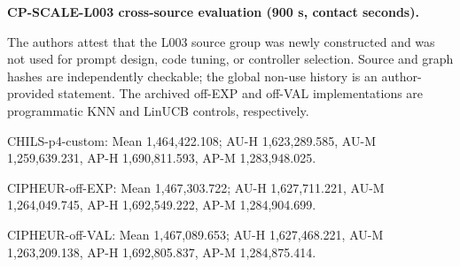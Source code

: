 \begingroup\raggedright
\noindent\textbf{CP-SCALE-L003 cross-source evaluation (900 s, contact seconds).}\par
\noindent The authors attest that the L003 source group was newly constructed and was not used for prompt design, code tuning, or controller selection. Source and graph hashes are independently checkable; the global non-use history is an author-provided statement. The archived off-EXP and off-VAL implementations are programmatic KNN and LinUCB controls, respectively.\par
\noindent CHILS-p4-custom: Mean 1,464,422.108; AU-H 1,623,289.585, AU-M 1,259,639.231, AP-H 1,690,811.593, AP-M 1,283,948.025.\par
\noindent CIPHEUR-off-EXP: Mean 1,467,303.722; AU-H 1,627,711.221, AU-M 1,264,049.745, AP-H 1,692,549.222, AP-M 1,284,904.699.\par
\noindent CIPHEUR-off-VAL: Mean 1,467,089.653; AU-H 1,627,468.221, AU-M 1,263,209.138, AP-H 1,692,805.837, AP-M 1,284,875.414.\par
\endgroup

